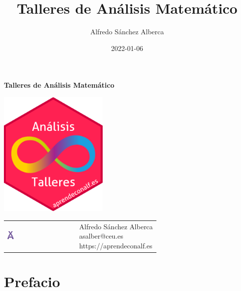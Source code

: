 \documentclass[
  a4paper,
]{scrreport}
\title{Talleres de Análisis Matemático}
\author{Alfredo Sánchez Alberca}
\date{2022-01-06}
\renewcommand*\contentsname{Tabla de contenidos}
\newcommand\contentsname{Tabla de contenidos}
\begin{document}
\begin{titlepage}

\begin{center}
\vspace*{5cm}

\Huge
{\textbf{\textsf{Talleres de Análisis Matemático}}}

\vspace{0.5cm}
\LARGE
{\textbf{\textsf{}}}

\vspace{1.5cm}

\includegraphics[width=0.4\textwidth]{img/logos/sticker.png}
\end{center}

\vfill

\begin{flushleft}
\begin{tabular}{ll}
\includegraphics[width=0.1\textwidth]{img/logos/aprendeconalf.png} & \parbox[b]{5cm}{\Large\textsf{Alfredo
Sánchez
Alberca}\\ \textsf{asalber@ceu.es} \\ \textsf{https://aprendeconalf.es}}
\end{tabular}
\end{flushleft}
\end{titlepage}
\renewcommand*\contentsname{Tabla de contenidos}
{
\hypersetup{linkcolor=}
\setcounter{tocdepth}{2}
\tableofcontents
}


\chapter*{Prefacio}\label{prefacio}
\end{document}
